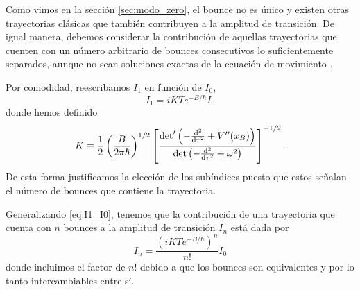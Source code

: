Como vimos en la sección \ref{sec:modo_zero}, el bounce no es único y existen otras trayectorias clásicas que también contribuyen a la amplitud de transición. De igual manera, debemos considerar la contribución de aquellas trayectorias que cuenten con un número arbitrario de bounces consecutivos lo suficientemente separados, aunque no sean soluciones exactas de la ecuación de movimiento \cite{weinberg2012classical}. 

Por comodidad, reescribamos $I_1$ 
en función de $I_0$, 
\begin{equation} \label{eq:I1_I0}
	I_1 = iKTe^{-B/\hbar}I_0
\end{equation}
donde hemos definido 
 \begin{equation}
K \equiv \frac{1}{2} \left(\frac{B}{2\pi\hbar}\right)^{1/2} \left[ \frac{\textrm{det}' \left(-\dv[2]{}{\tau} + V''(x_B) \right)}{\det \left(-\dv[2]{}{\tau} + \omega^2 \right)}\right]^{-1/2}.
\end{equation}
De esta forma justificamos la elección de los subíndices puesto que estos señalan el número de bounces que contiene la trayectoria. 

Generalizando \eqref{eq:I1_I0}, tenemos que la contribución de una trayectoria que cuenta con $n$ bounces a la amplitud de transición $I_n$ está dada por
\begin{equation} \label{eq:I_n}
I_n = \frac{\left(iKTe^{-B/\hbar}\right)^n}{n!} I_0
\end{equation}
donde incluimos el factor de $n!$ debido a que los bounces son equivalentes y por lo tanto intercambiables entre sí. 

